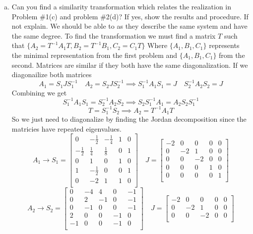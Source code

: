 \documentclass{article}
\begin{document}
\begin{enumerate}[(a)]
\item Can you find a similarity transformation which relates the realization in Problem \#1(c) and problem \#2(d)?
If yes, show the results and procedure. If not explain.
\newline
We should be able to as they describe the same system and have the same degree.
To find the transformation we must find a matrix $T$ such that $\{A_2 = T^{-1}A_1T, B_2=T^{-1}B_1, C_2=C_1T\}$
Where $\{ A_1, B_1, C_1 \}$ represents the minimal representation from the first problem and $\{ A_1, B_1, C_1 \}$ from the second.
Matrices are similar if they both have the same diagonalization.
If we diagonailize both matrices
$$ A_1 = S_1JS_1^{-1} \quad A_2 = S_2JS_2^{-1} \implies S_1^{-1}A_1S_1 = J \quad S_2^{-1}A_2S_2 = J$$
Combining we get
$$ S_1^{-1}A_1S_1 = S_2^{-1}A_2S_2  \implies S_2S_1^{-1}A_1 = A_2S_2S_1^{-1}$$
$$ T = S_1^{-1}S_2 \implies A_2 = T^{-1}A_1T$$
So we just need to diagonalize by finding the Jordan decomposition since the matricies have repeated eigenvalues.
$$A_1 \to S_1 =
\begin{bmatrix}
0 & -\frac{1}{2} & -\frac{1}{4} & 1 & 0 \\
-\frac{1}{2} & \frac{1}{4} & \frac{1}{8} & 0 & 1 \\
0 & 1 & 0 & 1 & 0 \\
1 & -\frac{1}{2} & 0 & 0 & 1 \\
0 & -2 & 1 & 1 & 0 \\
\end{bmatrix}
\quad
J =
\begin{bmatrix}
-2 & 0 & 0 & 0 & 0 \\
0 & -2 & 1 & 0 & 0 \\
0 & 0 & -2 & 0 & 0 \\
0 & 0 & 0 & 1 & 0 \\
0 & 0 & 0 & 0 & 1 \\
\end{bmatrix}
$$
$$A_2 \to S_2 =
\begin{bmatrix}
0 & -4 & 4 & 0 & -1 \\
0 & 2 & -1 & 0 & -1 \\
0 & -1 & 0 & 0 & -1 \\
2 & 0 & 0 & -1 & 0 \\
-1 & 0 & 0 & -1 & 0 \\
\end{bmatrix}
\quad
J =
\begin{bmatrix}
-2 & 0 & 0 & 0 & 0 \\
0 & -2 & 1 & 0 & 0 \\
0 & 0 & -2 & 0 & 0 \\

\end{bmatrix}$$
\end{enumerate}
\end{document}
